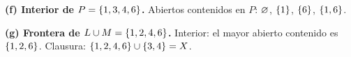 \textbf{(f) Interior de $P=\{1,3,4,6\}$.} Abiertos contenidos en $P$: $\varnothing$, $\{1\}$, $\{6\}$, $\{1,6\}$.

\textbf{(g) Frontera de $L\cup M=\{1,2,4,6\}$.} Interior: el mayor abierto contenido es $\{1,2,6\}$. Clausura:
$\{1,2,4,6\}\cup\{3,4\}=X$.
